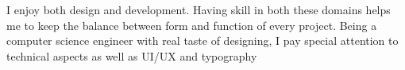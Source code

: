 \cventry{}
    {}
    {I enjoy both design and development. Having skill in both these domains helps me to keep the balance between form and function of every project. Being a computer science engineer with real taste of designing, I pay special attention to technical aspects as well as UI/UX and typography}
    {}
    {}
    {}
    \vspace*{0.2\baselineskip}

